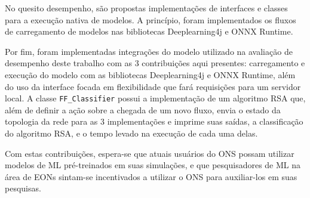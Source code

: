 No quesito desempenho, são propostas implementações de interfaces e classes para a execução nativa de modelos. A princípio, foram implementados os fluxos de carregamento de modelos nas bibliotecas Deeplearning4j e ONNX Runtime.

Por fim, foram implementadas integrações do modelo utilizado na avaliação de desempenho deste trabalho com as 3 contribuições aqui presentes: carregamento e execução do modelo com as bibliotecas Deeplearning4j e ONNX Runtime, além do uso da interface focada em flexibilidade que fará requisições para um servidor local. A classe \texttt{FF\_Classifier} possui a implementação de um algoritmo RSA que, além de definir a ação sobre a chegada de um novo fluxo, envia o estado da topologia da rede para as 3 implementações e imprime suas saídas, a classificação do algoritmo RSA, e o tempo levado na execução de cada uma delas.

Com estas contribuições, espera-se que atuais usuários do ONS possam utilizar modelos de ML pré-treinados em suas simulações, e que pesquisadores de ML na área de EONs sintam-se incentivados a utilizar o ONS para auxiliar-los em suas pesquisas.